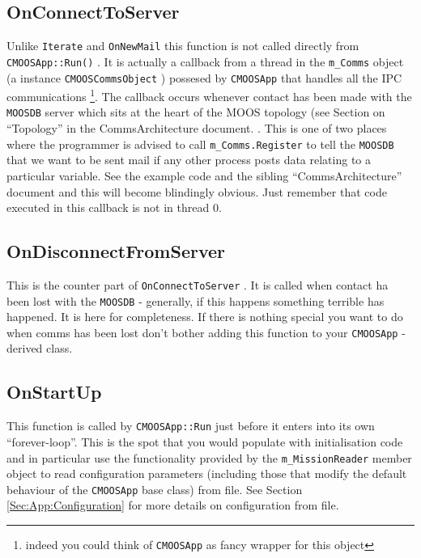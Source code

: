 \documentclass[a4paper,10pt]{article}
\newcommand{\Code}[1]{\texttt{#1} }
\newcommand{\code}[1]{\Code{#1} }
\begin{document}
\subsection{OnConnectToServer}\label{Sec:OnConnectToServer}

Unlike \code{Iterate} and \code{OnNewMail} this function is not
called directly from \code{CMOOSApp::Run()}. It is actually a
callback from a thread in the \code{m\_Comms} object (a instance
\code{CMOOSCommsObject}) possesed by \code{CMOOSApp} that handles
all the IPC communications \footnote{indeed you could think of
\code{CMOOSApp} as fancy wrapper for this object}. The callback
occurs whenever contact has been made with the \code{MOOSDB}
server which sits at the heart of the MOOS topology (see Section on ``Topology'' in the CommsArchitecture document.
. This is one of two places where  the
programmer is advised to call \code{m\_Comms.Register} to tell the
\code{MOOSDB} that we want to be sent mail if any other process
posts data relating to a particular variable. See the example code
and the sibling ``CommsArchitecture'' document and this will become
blindingly obvious. Just remember that code executed in this
callback is not in thread 0.

\subsection{OnDisconnectFromServer}\label{Sec:OnDisconnectFromServer}
This is the counter part of \code{OnConnectToServer}. It is called
when contact ha been lost with the \code{MOOSDB} - generally, if
this happens something terrible has happened. It is here for
completeness. If there is nothing special you want to do when
comms has been lost don't bother adding this function to your
\code{CMOOSApp}-derived class.


\subsection{OnStartUp}\label{Sec:OnStartUp}

This function is called by \code{CMOOSApp::Run} just before it
enters into its own ``forever-loop''. This is the spot that you
would populate with initialisation code and in particular use the
functionality provided by the \code{m\_MissionReader} member
object to read configuration parameters (including those that
modify the default behaviour of the  \code{CMOOSApp} base class)
from file. See Section \ref{Sec:App:Configuration} for more
details on configuration from file.
\end{document}
